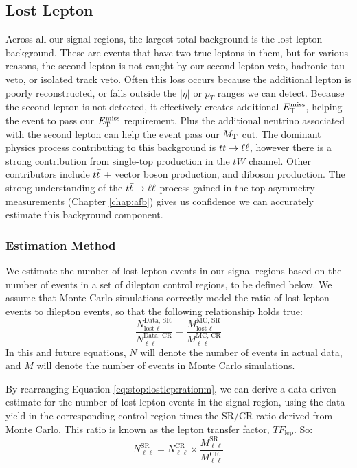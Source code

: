 \subsection{Lost Lepton}
\label{ssec:stop:lostlep}

Across all our signal regions, the largest total background
is the lost lepton background. These are events that have two true
leptons in them, but for various reasons, the second lepton is not
caught by our second lepton veto, hadronic tau veto, or isolated track
veto. Often this loss occurs because the additional lepton is poorly
reconstructed, or falls outside the $|\eta|$ or $p_T$ ranges we can
detect. Because the second lepton is not detected, it effectively
creates additional $E_\text{T}^\text{miss}$, helping the event to pass our $E_\text{T}^\text{miss}$
requirement. Plus the additional neutrino associated with the second
lepton can help the event pass our $M_\text{T}$ cut. The dominant physics
process contributing to this background is $t\bar{t} \rightarrow \ell\ell$, however there
is a strong contribution from single-top production in the $tW$
channel. Other contributors include $t\bar{t}$ + vector boson
production, and diboson production. The strong understanding of the
$t\bar{t} \rightarrow \ell\ell$ process gained in the top asymmetry measurements (Chapter
\ref{chap:afb}) gives us confidence we can accurately estimate this
background component.

\subsubsection{Estimation Method}
\label{sssec:stop:lostlep:estimation}

We estimate the number of lost lepton events in our signal regions
based on the number of events in a set of dilepton control regions, to be
defined below. We assume that Monte Carlo simulations correctly model
the ratio of lost lepton events to dilepton events, so that the
following relationship holds true:
\begin{equation}
\label{eq:stop:lostlep:rationm}
\frac{N_{\text{lost }\ell}^\text{Data, SR}}{N_{\ell\ell}^\text{Data, CR}} =
\frac{M_{\text{lost }\ell}^\text{MC, SR}}{M_{\ell\ell}^\text{MC, CR}}
\end{equation}
In this and future equations, $N$ will denote the number of events in
actual data, and $M$ will denote the number of events in Monte Carlo
simulations.

By rearranging Equation \ref{eq:stop:lostlep:rationm}, we can derive
a data-driven estimate for the number of lost lepton events in the
signal region, using the data yield in the corresponding control region
times the SR/CR ratio derived from Monte Carlo. This ratio is known as
the lepton transfer factor, $TF_\text{lep}$. So:
\begin{equation}
\label{eq:stop:lostlep:estimate}
N_{\ell\ell}^\text{SR} = N_{\ell\ell}^\text{CR} \times \frac{M_{\ell\ell}^\text{SR}}{M_{\ell\ell}^\text{CR}}
\end{equation}

